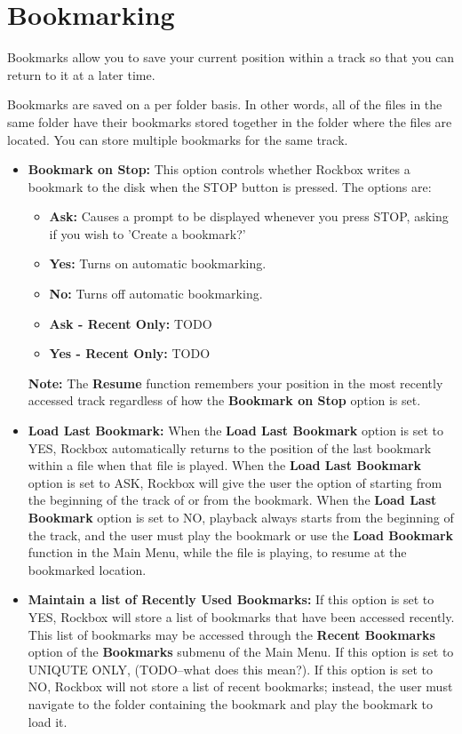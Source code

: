 \section{\label{ref:Bookmarkconfigactual}Bookmarking}
  Bookmarks allow you to save your current position within a track so that you can return to it at a later time.

	Bookmarks are saved on a per folder basis. In other words, all of the files in the same folder have their bookmarks stored together in the folder where the files are located. You can store multiple bookmarks for the same track.
  \begin{itemize}
  \item \textbf{Bookmark on Stop:  }
  	This option controls whether Rockbox writes a bookmark to the disk when the STOP button is pressed.  The options are:
  	\begin{itemize}
  	\item \textbf{Ask:  }Causes a prompt to be displayed whenever you press STOP, asking if you wish to 'Create a bookmark?'
  	\item \textbf{Yes:  }Turns on automatic bookmarking.
  	\item \textbf{No:  }Turns off automatic bookmarking.
  	\item \textbf{Ask - Recent Only:  }TODO
  	\item \textbf{Yes - Recent Only:  }TODO
		\end{itemize}
		\textbf{Note:  }The \textbf{Resume} function remembers your position in the most recently accessed track regardless of how the \textbf{Bookmark on Stop} option is set.
    
  \item \textbf{Load Last Bookmark:}
    When the \textbf{Load Last Bookmark} option is set to YES, Rockbox automatically returns to the position of the last bookmark within a file when that file is played. When the \textbf{Load Last Bookmark} option is set to ASK, Rockbox will give the user the option of starting from the beginning of the track of or from the bookmark. When the \textbf{Load Last Bookmark} option is set to NO, playback always starts from the beginning of the track, and the user must play the bookmark or use the \textbf{Load Bookmark} function in the Main Menu, while the file is playing, to resume at the bookmarked location.
  \item \textbf{Maintain a list of Recently Used Bookmarks:}
    If this option is set to YES, Rockbox will store a list of bookmarks that have been accessed recently.  This list of bookmarks may be accessed through the \textbf{Recent Bookmarks} option of the \textbf{Bookmarks} submenu of the Main Menu.  If this option is set to UNIQUTE ONLY, (TODO--what does this mean?).  If this option is set to NO, Rockbox will not store a list of recent bookmarks; instead, the user must navigate to the folder containing the bookmark and play the bookmark to load it.
  \end{itemize}